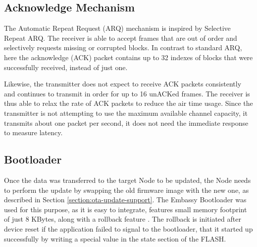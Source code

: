\subsection{Acknowledge Mechanism}
The Automatic Repeat Request (ARQ) mechanism is inspired by Selective Repeat ARQ. The receiver is able to accept frames that are out of order and selectively requests missing or corrupted blocks. In contrast to standard ARQ, here the acknowledge (ACK) packet contains up to 32 indexes of blocks that were successfully received, instead of just one.

Likewise, the transmitter does not expect to receive ACK packets consistently and continues to transmit in order for up to 16 unACKed frames. The receiver is thus able to relax the rate of ACK packets to reduce the air time usage. Since the transmitter is not attempting to use the maximum available channel capacity, it transmits about one packet per second, it does not need the immediate response to measure latency.

\subsection{Bootloader}
Once the data was transferred to the target Node to be updated, the Node needs to perform the update by swapping the old firmware image with the new one, as described in Section \ref{section:ota-update-support}. The Embassy Bootloader was used for this purpose, as it is easy to integrate, features small memory footprint of just 8 KBytes, along with a rollback feature \cite{embassy_project_documentation_bootloader_2024}. The rollback is initiated after device reset if the application failed to signal to the bootloader, that it started up successfully by writing a special value in the state section of the FLASH.
